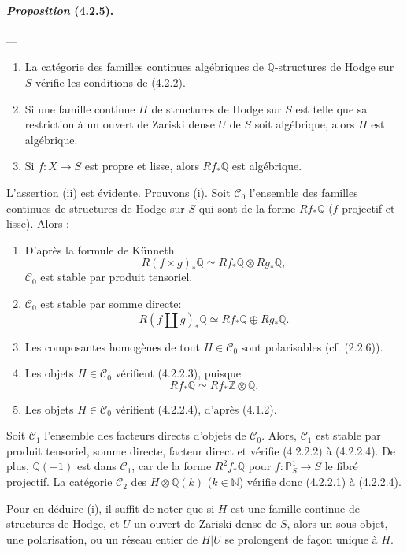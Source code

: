\documentclass[10pt]{article}
\newcommand{\Q}{\mathbb Q}
\newcommand{\Z}{\mathbb Z}
\newcommand{\N}{\mathbb N}
\newcommand{\bbP}{\mathbb P}
\begin{document}
\paragraph{\emph{Proposition} (4.2.5).} --- {\itshape
\begin{enumerate}[label=(\roman*)]
\item La catégorie des familles continues algébriques de $\Q$-structures de Hodge sur $S$ vérifie les conditions de (4.2.2).
\item Si une famille continue $H$ de structures de Hodge sur $S$ est telle que sa restriction à un ouvert de Zariski dense $U$ de $S$ soit algébrique, alors $H$ est algébrique.
\item Si $f:X\to S$ est propre et lisse, alors $Rf_*\Q$ est algébrique.
\end{enumerate}}

L'assertion (ii) est évidente. Prouvons (i). Soit $\mathcal C_0$ l'ensemble des familles continues de structures de Hodge sur $S$ qui sont de la forme $Rf_*\Q$ ($f$ projectif et lisse). Alors :
\begin{enumerate}[label=\alph*)]
\item D'après la formule de Künneth
\[
R(f\times g)_*\Q\simeq Rf_*\Q\otimes Rg_*\Q,
\]
$\mathcal C_0$ est stable par produit tensoriel.
\item $\mathcal C_0$ est stable par somme directe:
\[
R(f\amalg g)_*\Q\simeq Rf_*\Q\oplus Rg_*\Q.
\]
\end{enumerate}



\begin{enumerate}[label=\alph*)]
\setcounter{enumi}{2}
\item Les composantes homogènes de tout $H\in\mathcal C_0$ sont polarisables (cf. (2.2.6)).
\item Les objets $H\in\mathcal C_0$ vérifient (4.2.2.3), puisque
\[
Rf_*\Q\simeq Rf_*\Z\otimes\Q.
\]
\item Les objets $H\in\mathcal C_0$ vérifient (4.2.2.4), d'après (4.1.2).
\end{enumerate}
Soit $\mathcal C_1$ l'ensemble des facteurs directs d'objets de $\mathcal C_0$. Alors, $\mathcal C_1$ est stable par produit tensoriel, somme directe, facteur direct et vérifie (4.2.2.2) à (4.2.2.4). De plus, $\Q(-1)$ est dans $\mathcal C_1$, car de la forme $R^2f_*\Q$ pour $f:\bbP^1_S\to S$ le fibré projectif. La catégorie $\mathcal C_2$ des $H\otimes\Q(k)$ ($k\in\N$) vérifie donc (4.2.2.1) à (4.2.2.4).

Pour en déduire (i), il suffit de noter que si $H$ est une famille continue de structures de Hodge, et $U$ un ouvert de Zariski dense de $S$, alors un sous-objet, une polarisation, ou un réseau entier de $H|U$ se prolongent de façon unique à $H$.
\end{document}
